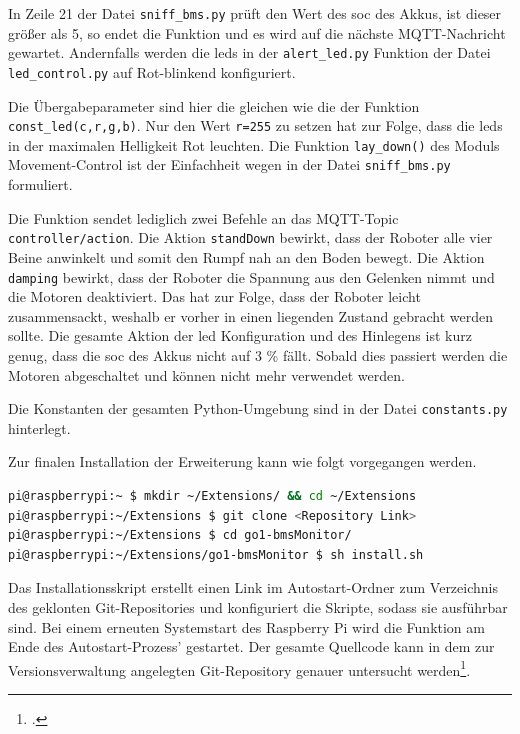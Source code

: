 In Zeile \num{21} der Datei \texttt{sniff\_bms.py} prüft den Wert des \gls{soc} des Akkus, ist dieser größer als \num{5},
so endet die Funktion und es wird auf die nächste MQTT-Nachricht gewartet.
Andernfalls werden die \glspl{led} in der \texttt{alert\_led.py} Funktion der Datei \texttt{led\_control.py}
auf Rot-blinkend konfiguriert.



\noindent Die Übergabeparameter sind hier die gleichen wie die der Funktion \texttt{const\_led(c,r,g,b)}.
Nur den Wert \texttt{r=255} zu setzen hat zur Folge, dass die \glspl{led} in der maximalen Helligkeit Rot leuchten.
Die Funktion \texttt{lay\_down()} des Moduls Movement-Control ist der Einfachheit wegen in der Datei \texttt{sniff\_bms.py}
formuliert.



\noindent Die Funktion sendet lediglich zwei Befehle an das MQTT-Topic \texttt{controller/action}.
Die Aktion \texttt{standDown} bewirkt, dass der Roboter alle vier Beine anwinkelt und somit den Rumpf nah an
den Boden bewegt.
Die Aktion \texttt{damping} bewirkt, dass der Roboter die Spannung aus den Gelenken nimmt und die Motoren deaktiviert.
Das hat zur Folge, dass der Roboter leicht zusammensackt, weshalb er vorher in einen liegenden Zustand gebracht werden sollte.
Die gesamte Aktion der \gls{led} Konfiguration und des Hinlegens ist kurz genug, dass die \gls{soc} des Akkus nicht auf
\num{3} \% fällt.
Sobald dies passiert werden die Motoren abgeschaltet und können nicht mehr verwendet werden.

Die Konstanten der gesamten Python-Umgebung sind in der Datei \texttt{constants.py} hinterlegt.



\noindent Zur finalen Installation der Erweiterung kann wie folgt vorgegangen werden.

\begin{lstlisting}[language=Bash]
pi@raspberrypi:~ $ mkdir ~/Extensions/ && cd ~/Extensions
pi@raspberrypi:~/Extensions $ git clone <Repository Link>
pi@raspberrypi:~/Extensions $ cd go1-bmsMonitor/
pi@raspberrypi:~/Extensions/go1-bmsMonitor $ sh install.sh
\end{lstlisting}

\noindent Das Installationsskript erstellt einen Link im Autostart-Ordner zum Verzeichnis des geklonten Git-Repositories und
konfiguriert die Skripte, sodass sie ausführbar sind.
Bei einem erneuten Systemstart des Raspberry Pi wird die Funktion am Ende des Autostart-Prozess' gestartet.
Der gesamte Quellcode kann in dem zur Versionsverwaltung angelegten Git-Repository genauer untersucht werden\footcite{git-bms-monitor}.
